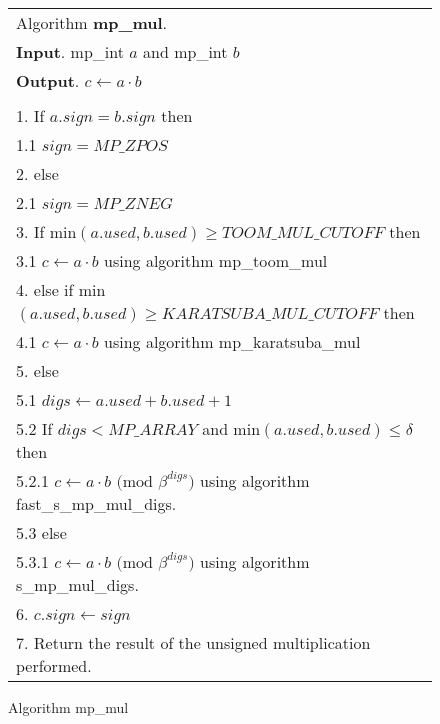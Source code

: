 \documentclass[b5paper]{book}
\begin{document}
\newpage\begin{figure}[!here]
\begin{small}
\begin{center}
\begin{tabular}{l}
\hline Algorithm \textbf{mp\_mul}. \\
\textbf{Input}.   mp\_int $a$ and mp\_int $b$ \\
\textbf{Output}.  $c \leftarrow a \cdot b$ \\
\hline \\
1.  If $a.sign = b.sign$ then \\
\hspace{3mm}1.1  $sign = MP\_ZPOS$ \\
2.  else \\
\hspace{3mm}2.1  $sign = MP\_ZNEG$ \\
3.  If min$(a.used, b.used) \ge TOOM\_MUL\_CUTOFF$ then  \\
\hspace{3mm}3.1  $c \leftarrow a \cdot b$ using algorithm mp\_toom\_mul \\
4.  else if min$(a.used, b.used) \ge KARATSUBA\_MUL\_CUTOFF$ then \\
\hspace{3mm}4.1  $c \leftarrow a \cdot b$ using algorithm mp\_karatsuba\_mul \\
5.  else \\
\hspace{3mm}5.1  $digs \leftarrow a.used + b.used + 1$ \\
\hspace{3mm}5.2  If $digs < MP\_ARRAY$ and min$(a.used, b.used) \le \delta$ then \\
\hspace{6mm}5.2.1  $c \leftarrow a \cdot b \mbox{ (mod }\beta^{digs}\mbox{)}$ using algorithm fast\_s\_mp\_mul\_digs.  \\
\hspace{3mm}5.3  else \\
\hspace{6mm}5.3.1  $c \leftarrow a \cdot b \mbox{ (mod }\beta^{digs}\mbox{)}$ using algorithm s\_mp\_mul\_digs.  \\
6.  $c.sign \leftarrow sign$ \\
7.  Return the result of the unsigned multiplication performed. \\
\hline
\end{tabular}
\end{center}
\end{small}
\caption{Algorithm mp\_mul}
\end{figure}
\end{document}
